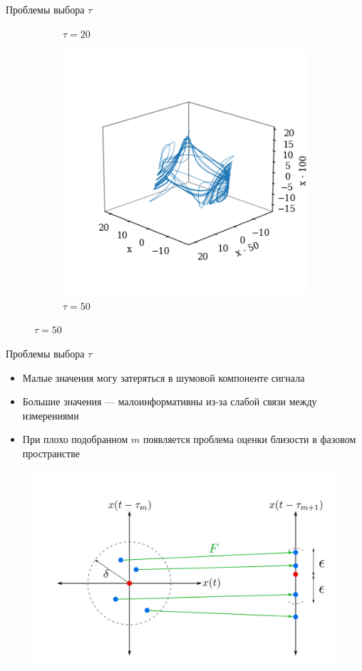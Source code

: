 \begin{frame}{Проблемы выбора $\tau$}
\begin{figure}
\begin{subfigure}[b]{0.24\textwidth}
    \caption{$\tau=20$}
  \end{subfigure}
  \begin{subfigure}[b]{0.24\textwidth}
    \includegraphics[width=\linewidth]{lecture_4/figs/tde_lorenz_tau_50.png}
    \caption{$\tau=50$}
  \end{subfigure}
\end{figure}

\end{frame}
\begin{frame}{Проблемы выбора $\tau$}
\begin{itemize}
    \item Малые значения могу затеряться в шумовой компоненте сигнала
    \item Большие значения --- малоинформативны из-за слабой связи между измерениями
    \item При плохо подобранном $m$ появляется проблема оценки близости в фазовом пространстве
\end{itemize}

\begin{figure}
    \includegraphics[width=0.7\linewidth]{lecture_4/figs/nn_problem.png}
\end{figure}

\end{frame}
